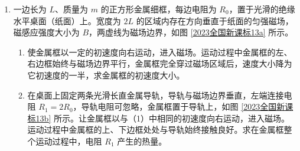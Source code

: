 \documentclass[\gkver]{gaokaozhenti}
\begin{document}
\begin{enumerate}
\item
一边长为 $L$、质量为 $m$ 的正方形金属细框，每边电阻为 $R_{0}$，置于光滑的绝缘水平桌面（纸面）上。宽度为 $2L$ 的区域内存在方向垂直于纸面的匀强磁场，磁感应强度大小为 $B$，两虚线为磁场边界，如图 \ref{2023全国新课标13a} 所示。
\begin{enumerate}
	\item
	使金属框以一定的初速度向右运动，进入磁场。运动过程中金属框的左、右边框始终与磁场边界平行，金属框完全穿过磁场区域后，速度大小降为它初速度的一半，求金属框的初速度大小。
	\item
	在桌面上固定两条光滑长直金属导轨，导轨与磁场边界垂直，左端连接电阻 $R_{1} = 2R_{0}$，导轨电阻可忽略，金属框置于导轨上，如图 \ref{2023全国新课标13b} 所示。让金属框以与（1）中相同的初速度向右运动，进入磁场。运动过程中金属框的上、下边框处处与导轨始终接触良好。求在金属框整个运动过程中，电阻 $R_{1}$ 产生的热量。
\end{enumerate}

\end{enumerate}
\end{document}

